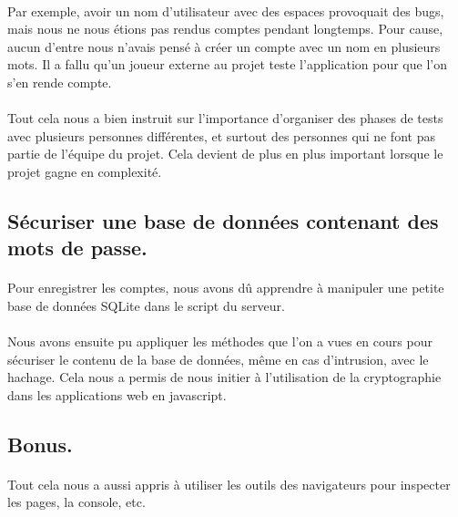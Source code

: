 \documentclass[11pt,a4paper]{article}
\begin{document}
            \paragraph{}
            Par exemple, avoir un nom d'utilisateur avec des espaces provoquait des bugs,
            mais nous ne nous étions pas rendus comptes pendant longtemps.
            Pour cause, aucun d'entre nous n'avais pensé à créer un compte avec un nom en plusieurs mots.
            Il a fallu qu'un joueur externe au projet teste l'application pour que l'on s'en rende compte.
            \paragraph{}
            Tout cela nous a bien instruit sur l'importance d'organiser des phases de tests
            avec plusieurs personnes différentes,
            et surtout des personnes qui ne font pas partie de l'équipe du projet.
            Cela devient de plus en plus important lorsque le projet gagne en complexité.
        \subsection*{Sécuriser une base de données contenant des mots de passe.}
            \paragraph{}
            Pour enregistrer les comptes,
            nous avons dû apprendre à manipuler une petite base de données SQLite dans le script du serveur.
            \paragraph{}
            Nous avons ensuite pu appliquer les méthodes que l'on a vues en cours pour sécuriser le contenu de la base de données, même en cas d'intrusion, avec le hachage.
            Cela nous a permis de nous initier à l'utilisation de la cryptographie dans les applications web en javascript.
        \subsection*{Bonus.}
            \paragraph{}
            Tout cela nous a aussi appris à utiliser les outils des navigateurs pour inspecter les pages,
            la console, etc.
\end{document}
